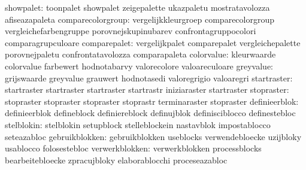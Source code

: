                       showpalet:  toonpalet                        showpalet
                                  zeigepalette                     ukazpaletu
                                  mostratavolozza                  afiseazapaleta
              comparecolorgroup:  vergelijkkleurgroep              comparecolorgroup
                                  vergleichefarbengruppe           porovnejskupinubarev
                                  confrontagruppocolori            comparagrupculoare
                   comparepalet:  vergelijkpalet                   comparepalet
                                  vergleichepalette                porovnejpaletu
                                  confrontatavolozza               comparapaleta
                     colorvalue:  kleurwaarde                      colorvalue
                                  farbewert                        hodnotabarvy
                                  valorecolore                     valoareculoare
                      greyvalue:  grijswaarde                      greyvalue
                                  grauwert                         hodnotasedi
                                  valoregrigio                     valoaregri
                    startraster:  startraster                      startraster
                                  startraster                      startrastr
                                  iniziaraster                     startraster %
                     stopraster:  stopraster                       stopraster
                                  stopraster                       stoprastr
                                  terminaraster                    stopraster
                  definieerblok:  definieerblok                    defineblock
                                  definiereblock                   definujblok
                                  definisciblocco                  definestebloc
                     stelblokin:  stelblokin                       setupblock
                                  stelleblockein                   nastavblok
                                  impostablocco                    seteazabloc
                 gebruikblokken:  gebruikblokken                   useblocks
                                  verwendebloecke                  uzijbloky
                                  usablocco                        folosestebloc
                 verwerkblokken:  verwerkblokken                   processblocks
                                  bearbeitebloecke                 zpracujbloky
                                  elaborablocchi                   proceseazabloc

